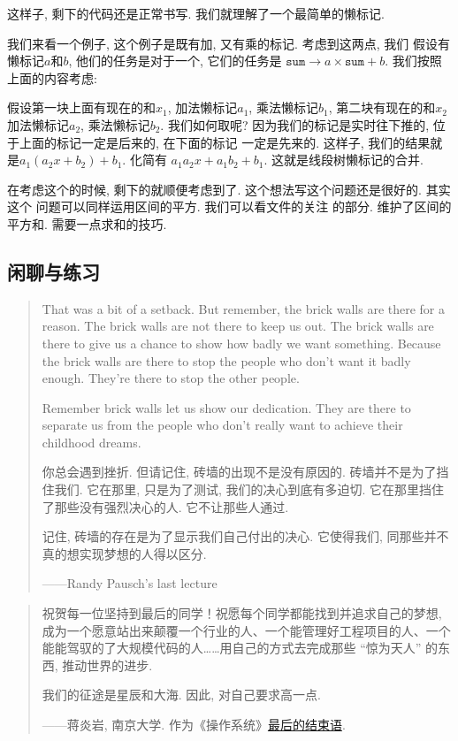 这样子, 剩下的代码还是正常书写. 我们就理解了一个最简单的懒标记. 

我们来看一个例子, 这个例子是既有加, 又有乘的标记. 考虑到这两点, 我们
假设有懒标记$a$和$b$, 他们的任务是对于一个, 它们的任务是
$\texttt{sum} \to a\times\texttt{sum}+b$. 我们按照上面的内容考虑: 

 假设第一块上面有现在的和$x_1$, 加法懒标记$a_1$, 
乘法懒标记$b_1$, 第二块有现在的和$x_2$加法懒标记$a_2$, 乘法懒标记$b_2$. 我们如何取呢? 因为我们的标记是实时往下推的, 位于上面的标记一定是后来的, 在下面的标记
一定是先来的. 这样子, 我们的结果就是$a_1(a_2x+b_2)+b_1$. 化简有
$a_1a_2x+a_1b_2+b_1$. 这就是线段树懒标记的合并. 

在考虑这个的时候, 剩下的就顺便考虑到了. 这个想法写这个问题还是很好的. 其实这个
问题可以同样运用区间的平方. 我们可以看文件的关注
的部分. 维护了区间的平方和. 需要一点求和的技巧. 

\subsection*{闲聊与练习}

\begin{quote}
    That was a bit of a setback. But remember, the brick walls are there for a reason. The brick walls are not there to keep us out. The brick walls are there to give us a chance to show how badly we want something. Because the brick walls are there to stop the people who don’t want it badly enough. They’re there to stop the other people.
    
    Remember brick walls let us show our dedication. They are there to 
    separate us from the people who don't really want to achieve their 
    childhood dreams. 

    你总会遇到挫折. 但请记住, 砖墙的出现不是没有原因的. 砖墙并不是为了挡住我们. 它在那里, 只是为了测试, 我们的决心到底有多迫切. 它在那里挡住了那些没有强烈决心的人. 它不让那些人通过. 

    记住, 砖墙的存在是为了显示我们自己付出的决心. 它使得我们, 同那些并不真的想实现梦想的人得以区分. 
    
    \hfill ——Randy Pausch's last lecture
\end{quote}

\begin{quote}
    祝贺每一位坚持到最后的同学！祝愿每个同学都能找到并追求自己的梦想, 成为一个愿意站出来颠覆一个行业的人、一个能管理好工程项目的人、一个能能驾驭的了大规模代码的人……用自己的方式去完成那些 “惊为天人” 的东西, 推动世界的进步. 

    我们的征途是星辰和大海. 因此, 对自己要求高一点. 

    \hfill ——蒋炎岩, 南京大学. 作为《操作系统》\href{www.bilibili.com/video/BV1gM4y1Y7nd?}{最后的结束语}. 

\end{quote}
